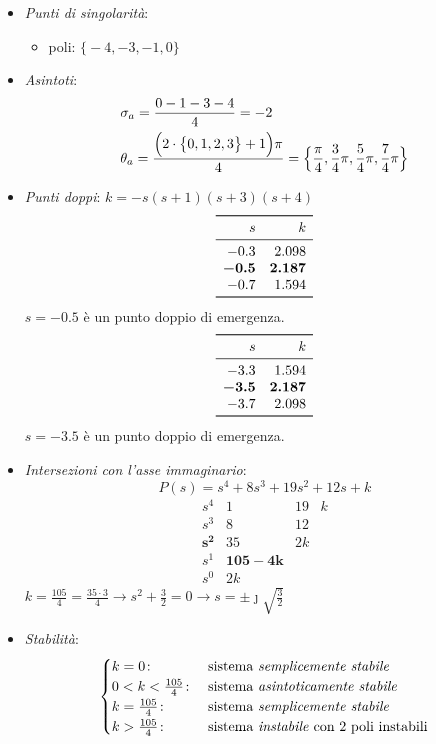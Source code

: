 \begin{esercizio}
\begin{itemize}
	\item \emph{Punti di singolarità}:
		\begin{itemize}
			\item poli: \(\bigl\{ -4,-3,-1,0 \bigr\}\)
		\end{itemize}
	\item \emph{Asintoti}:
		\begin{align*}
			& \sigma_a = \frac{0-1-3-4}{4} = -2 \\
			& \theta_a = \frac{\Bigl(2\cdot\bigl\{0,1,2,3\bigr\}+1\Bigr)\pi}{4} = \Bigl\{ \frac{\pi}{4},\frac{3}{4}\pi,\frac{5}{4}\pi,\frac{7}{4}\pi \Bigr\}
		\end{align*}
	\item \emph{Punti doppi}: \(k = -s(s+1)(s+3)(s+4)\)
		\[\begin{array}{rr}
			\toprule
			s 	  & k 		\\
			\midrule
			-0.3 	  & 2.098 	\\
			\bm{-0.5} & \bm{2.187}	\\
			-0.7 	  & 1.594	\\
			\bottomrule
		\end{array}\]
		\(s=-0.5\) è un punto doppio di emergenza.
		\[\begin{array}{rr}
			\toprule
			s 	  & k 		\\
			\midrule
			-3.3 	  & 1.594 	\\
			\bm{-3.5} & \bm{2.187} 	\\
			-3.7 	  & 2.098 	\\
			\bottomrule
		\end{array}\]
		\(s=-3.5\) è un punto doppio di emergenza.
	\item \emph{Intersezioni con l'asse immaginario}:
		\[
			P(s) = s^4 +8s^3 +19s^2 +12s +k
		\]
		\[\begin{array}{r|rrr}
			s^4 	 &  1 & 19 & k  \\
			s^3 	 &  8 & 12 	\\
			\bm{s^2} & 35 & 2k 	\\
			s^1 	 & \bm{105-4k} 	\\
			s^0 	 & 2k
		\end{array}\]
		\(k = \frac{105}{4} = \frac{35\cdot3}{4} \rightarrow s^2+\frac{3}{2} = 0 \rightarrow s = \pm\jmath\sqrt{\frac{3}{2}}\)
	\item \emph{Stabilità}:
		\[\begin{cases}
			k = 0\colon & \text{sistema \emph{semplicemente stabile}} \\
			0<k<\frac{105}{4}\colon & \text{sistema \emph{asintoticamente stabile}} \\
			k = \frac{105}{4}\colon & \text{sistema \emph{semplicemente stabile}} \\
			k > \frac{105}{4}\colon & \text{sistema \emph{instabile} con 2 poli instabili}
		\end{cases}\]
\end{itemize}


\end{esercizio}
